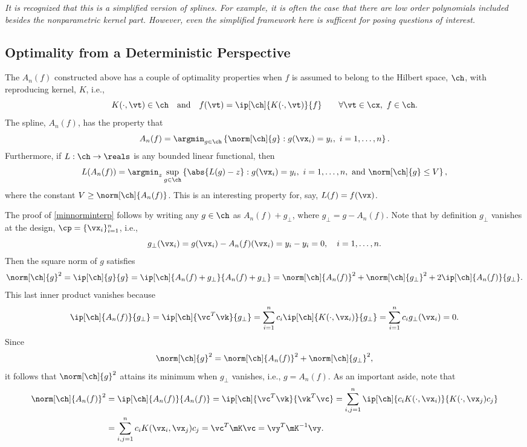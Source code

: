 \documentclass[11pt]{amsart}
\theoremstyle{definition}
\begin{document}
\emph{It is recognized that this is a simplified version of splines.  For example, it is often the case that there are low order polynomials included besides the nonparametric kernel part.  However, even the simplified framework here is sufficent for posing questions of interest.}

\subsection{Optimality from a Deterministic Perspective \cite{Fas07a,Wen05a}}
The $A_n(f)$ constructed above has a couple of optimality properties when $f$ is assumed to belong to the Hilbert space, $\ch$, with reproducing kernel, $K$, i.e.,
\begin{equation*}
K(\cdot, \vt) \in \ch \quad \text{and} \quad f(\vt) = \ip[\ch]{K(\cdot,\vt)}{f} \qquad \forall \vt \in \cx,\ f \in \ch .
\end{equation*}
The spline, $A_n(f)$, has the property that
\begin{equation} \label{minnorminterp}
A_n(f) = \argmin_{g \in \ch } \left \{ \norm[\ch]{g} : g(\vx_i) = y_i,\ i=1, \ldots, n \right \}.
\end{equation}
Furthermore, if $L:\ch \to \reals$ is any bounded linear functional, then
\begin{equation} \label{bestlinfunctional}
L(A_n(f)) = \argmin_z \sup_{g \in \ch } \left \{ \abs{L(g) - z} : g(\vx_i) = y_i,\ i=1, \ldots, n, \text{ and } \norm[\ch]{g} \le V \right \},
\end{equation}
where the constant $V\ge\norm[\ch]{A_n(f)}$. This is an interesting property for, say, $L(f) = f(\vx)$.

The proof of \eqref{minnorminterp} follows by writing any $g \in \ch$ as $A_n(f) + g_{\perp}$, where $g_{\perp} = g -A_n(f)$.  Note that by definition $g_{\perp}$ vanishes at the design, $\cp=\{\vx_i\}_{i=1}^n$, i.e.,
\[
g_{\perp}(\vx_i) = g(\vx_i) - A_n(f)(\vx_i) = y_i - y_i = 0, \quad i=1, \dots, n.
\]
Then the square norm of $g$ satisfies
\begin{equation*}
\norm[\ch]{g}^2 = \ip[\ch]{g}{g} = \ip[\ch]{A_n(f)+g_{\perp}}{A_n(f)+g_{\perp}} = \norm[\ch]{A_n(f)}^2 + \norm[\ch]{g_{\perp}}^2 + 2 \ip[\ch]{A_n(f)}{g_{\perp}}.
\end{equation*}
This last inner product vanishes because
\begin{equation*}
\ip[\ch]{A_n(f)}{g_{\perp}} = \ip[\ch]{\vc^T \vk}{g_{\perp}} =  \sum_{i=1}^{n} c_i \ip[\ch]{K(\cdot,\vx_i)}{g_{\perp}}=  \sum_{i=1}^{n} c_i g_{\perp}(\vx_i) = 0.
\end{equation*}
Since
\[
\norm[\ch]{g}^2 = \norm[\ch]{A_n(f)}^2 + \norm[\ch]{g_{\perp}}^2,
\]
it follows that $\norm[\ch]{g}^2$ attains its minimum when $g_{\perp}$ vanishes, i.e., $g=A_n(f)$.  As an important aside, note that
\begin{align*}
\norm[\ch]{A_n(f)}^2 &= \ip[\ch]{A_n(f)}{A_n(f)} = \ip[\ch]{\vc^T \vk}{\vk^T \vc} = \sum_{i,j=1}^n \ip[\ch]{c_i K(\cdot, \vx_i)}{K(\cdot, \vx_j) c_j}\\
&= \sum_{i,j=1}^n c_i K(\vx_i, \vx_j) c_j = \vc^T \mK \vc = \vy^T \mK^{-1} \vy.
\end{align*}
\end{document}
